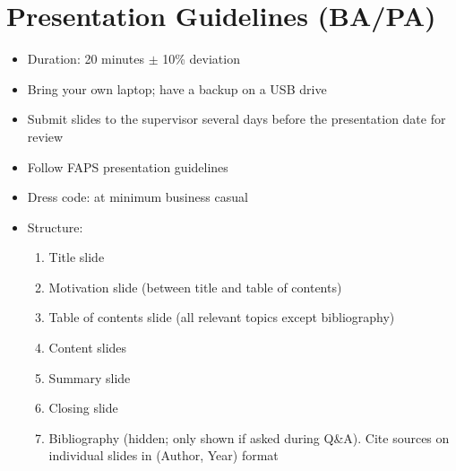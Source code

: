 \section{Presentation Guidelines (BA/PA)}

\begin{itemize}
    \item Duration: 20 minutes $\pm$ 10\% deviation
    \item Bring your own laptop; have a backup on a USB drive
    \item Submit slides to the supervisor several days before the presentation date for review
    \item Follow FAPS presentation guidelines
    \item Dress code: at minimum business casual
    \item Structure:
    \begin{enumerate}
        \item Title slide
        \item Motivation slide (between title and table of contents)
        \item Table of contents slide (all relevant topics except bibliography)
        \item Content slides
        \item Summary slide
        \item Closing slide
        \item Bibliography (hidden; only shown if asked during Q\&A). Cite sources on individual slides in (Author, Year) format
    \end{enumerate}
\end{itemize}